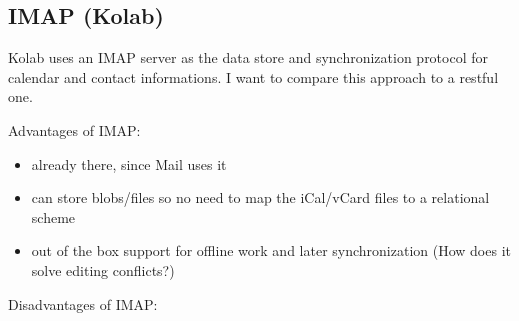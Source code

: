 \documentclass[12pt,a4paper]{scrartcl}		%
\begin{document}
\subsection{IMAP (Kolab)}

Kolab uses an IMAP server as the data store and
synchronization protocol for calendar and contact informations. I want to
compare this approach to a restful one.

Advantages of IMAP:
\begin{itemize}
\item already there, since Mail uses it
\item can store blobs/files so no need to map the iCal/vCard files to a relational scheme
\item out of the box support for offline work and later synchronization (How does it solve editing conflicts?)
\end{itemize}
Disadvantages of IMAP:
\end{document}
